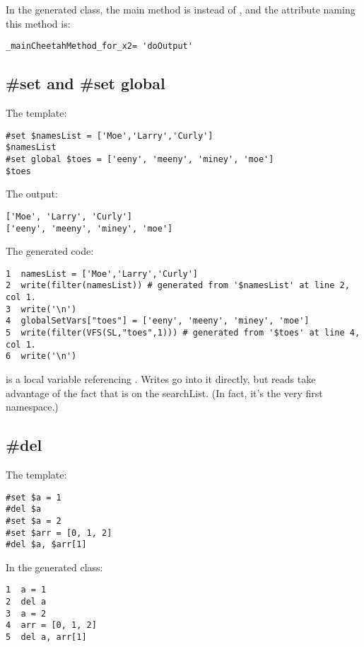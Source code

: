 In the generated class, the main method is  instead of
, and the attribute naming this method is:
\begin{verbatim}
_mainCheetahMethod_for_x2= 'doOutput'
\end{verbatim}


\subsection{\#set and \#set global}
\label{inheritanceEtc.set}

The template:
\begin{verbatim}
#set $namesList = ['Moe','Larry','Curly']
$namesList
#set global $toes = ['eeny', 'meeny', 'miney', 'moe']
$toes
\end{verbatim}

The output:
\begin{verbatim}
['Moe', 'Larry', 'Curly']
['eeny', 'meeny', 'miney', 'moe']
\end{verbatim}


The generated code:
\begin{verbatim}
1  namesList = ['Moe','Larry','Curly']
2  write(filter(namesList)) # generated from '$namesList' at line 2, col 1.
3  write('\n')
4  globalSetVars["toes"] = ['eeny', 'meeny', 'miney', 'moe']
5  write(filter(VFS(SL,"toes",1))) # generated from '$toes' at line 4, col 1.
6  write('\n')
\end{verbatim}

 is a local variable referencing .
Writes go into it directly, but reads take advantage of the fact that
 is on the searchList.  (In fact, it's the very first
namespace.)


\subsection{\#del}
\label{inheritanceEtc.del}

The template:
\begin{verbatim}
#set $a = 1
#del $a
#set $a = 2
#set $arr = [0, 1, 2]
#del $a, $arr[1]
\end{verbatim}

In the generated class:
\begin{verbatim}
1  a = 1
2  del a
3  a = 2
4  arr = [0, 1, 2]
5  del a, arr[1]
\end{verbatim}


